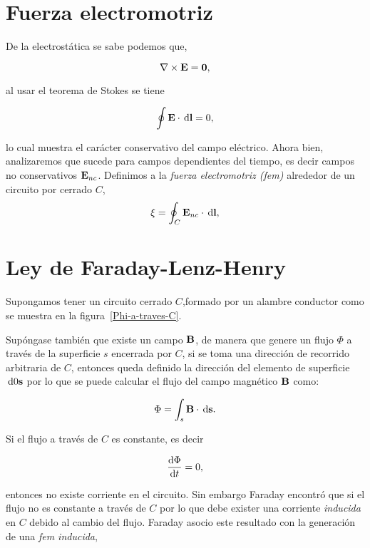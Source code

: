 \section{Fuerza electromotriz}
De la electrostática se sabe podemos que,

\begin{equation*}
	\nabla \times \textbf{E} = \textbf{0},
\end{equation*}

al usar el teorema de Stokes se tiene

\begin{equation}
	\label{Eq:CampoEConservativo}
	\oint \E \cdot \dl{\textbf{l}} = 0,
\end{equation}

lo cual muestra el carácter conservativo del campo eléctrico. Ahora bien, analizaremos que sucede para campos dependientes del tiempo, es decir campos no conservativos  $\textbf{E}_{nc}$. Definimos a la \emph{fuerza electromotriz (fem)} alrededor de un circuito por cerrado $C$,
\begin{equation}
	\label{Eq:Fza Electromotriz}
	\xi = \oint_{C} \E_{nc} \cdot \dl{\textbf{l}},
\end{equation}

\section{Ley de Faraday-Lenz-Henry}

Supongamos tener un circuito cerrado $C$,formado por un alambre conductor como se muestra en la figura~\ref{Phi-a-traves-C}.

Supóngase también que existe un campo $\textbf{B}$, de manera que genere un flujo $\Phi$ a través de la superficie $s$ encerrada por $C$, si se toma una dirección de recorrido arbitraria de $C$, entonces queda definido la dirección del elemento de superficie $\dl 0 \textbf{s}$ por lo que se puede calcular el flujo del campo magnético $\textbf{B}$ como:

\begin{equation}
	\Phi = \int_{s} \B \cdot \dl{\textbf{s}}.
	\label{Eq:FlujoMagnetico}
\end{equation}

Si el flujo a través de $C$ es constante, es decir

\begin{equation*}
	\diff{\Phi}{t} = 0,
\end{equation*}

entonces no existe corriente en el circuito. Sin embargo Faraday encontró que si el flujo no es constante a través de $C$ por lo que debe exister una corriente \emph{inducida} en $C$ debido al cambio del flujo. Faraday asocio este resultado con la generación de una \emph{fem inducida},

